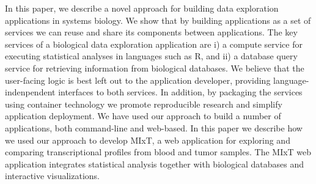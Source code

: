 In this paper, we describe a novel approach for building data exploration
applications in systems biology. We show that by building applications as a set
of services we can reuse and share its components between
applications. 
The key services of a biological data
exploration application are i) a compute service for executing statistical
analyses in languages such as R, and ii) a database query service for retrieving
information from biological databases. We believe that the user-facing logic is
best left out to the application developer, providing language-indenpendent
interfaces to both services. 
In addition, by packaging the services using container technology
we promote reproducible research and simplify application deployment. We have
used our approach to build a number of applications, both command-line and
web-based. In this paper we describe how we used our approach to develop MIxT,
a web application for exploring and comparing transcriptional profiles from
blood and tumor samples. The MIxT web application integrates statistical
analysis together with biological databases and interactive visualizations.

